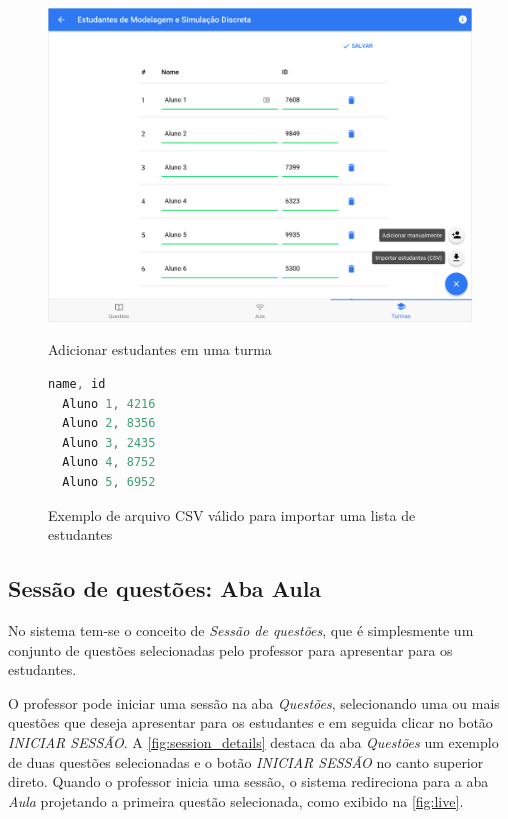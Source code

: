\begin{figure}[ht]
  \centering
  \caption{Adicionar estudantes em uma turma}
  \includegraphics[scale=.4]{imagens/telas/add_students}
  \doautor
  \label{fig:add_students}
\end{figure}

\begin{figure}[ht]
\caption{Exemplo de arquivo CSV válido para importar uma lista de estudantes}
\label{fig:import_csv}
\begin{lstlisting}[language=JavaScript]
  name, id
  Aluno 1, 4216
  Aluno 2, 8356
  Aluno 3, 2435
  Aluno 4, 8752
  Aluno 5, 6952
\end{lstlisting}
\doautor
\end{figure}

\subsection{Sessão de questões: Aba Aula}

No sistema tem-se o conceito de \textit{Sessão de questões}, que é
simplesmente um conjunto de questões selecionadas pelo professor
para apresentar para os estudantes.

O professor pode iniciar uma sessão na aba \textit{Questões}, selecionando
uma ou mais questões que deseja apresentar para os estudantes e
em seguida clicar no botão \textit{INICIAR SESSÃO}. A \autoref{fig:session_details}
destaca da aba \textit{Questões} um exemplo de duas questões selecionadas e o botão
\textit{INICIAR SESSÃO} no canto superior direto. Quando o professor inicia uma sessão,
o sistema redireciona para a aba \textit{Aula} projetando a primeira questão selecionada, como
exibido na \autoref{fig:live}.

